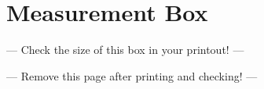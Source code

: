 \chapter*{Measurement Box}



\begin{center}
{\Large --- Check the size of this box in your printout! ---}

\bigskip


\bigskip

{\Large --- Remove this page after printing and checking! ---}

\end{center}

